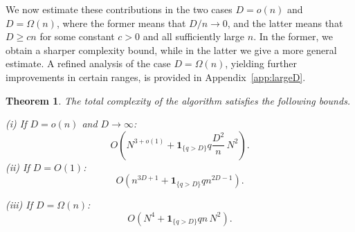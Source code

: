 \documentclass[a4paper, 12pt, oneside, openright]{article}
\newtheorem{thm}{Theorem}
\begin{document}
We now estimate these contributions in the two cases $D=o(n)$ and $D=\Omega(n)$, where the former means that $D/n\to 0$, and the latter means that $D\ge cn$ for some constant $c>0$ and all sufficiently large $n$. In the former, we obtain a sharper complexity bound, while in the latter we give a more general estimate. A refined analysis of the case $D=\Omega(n)$, yielding further improvements in certain ranges, is provided in Appendix~\ref{app:largeD}.


\begin{thm}\label{thm:compl}
The total complexity of the algorithm satisfies the following bounds.

\noindent\textup{(i)} If $D=o(n)$ and $D\to \infty$:
\[
O\left(N^{3+o(1)}+ \mathbf 1_{\{q>D\}}q \frac{D^2}{n}\,N^2 \right).
\]
\noindent\textup{(ii)} If $D=O(1)$:
\[
O(n^{3D+1}+\mathbf 1_{\{q>D\}}qn^{2D-1}).
\]

\smallskip
\noindent\textup{(iii)} If $D=\Omega(n)$:
\[
O(N^4+\mathbf 1_{\{q>D\}}qn\,N^2).
\]
\end{thm}
\end{document}
